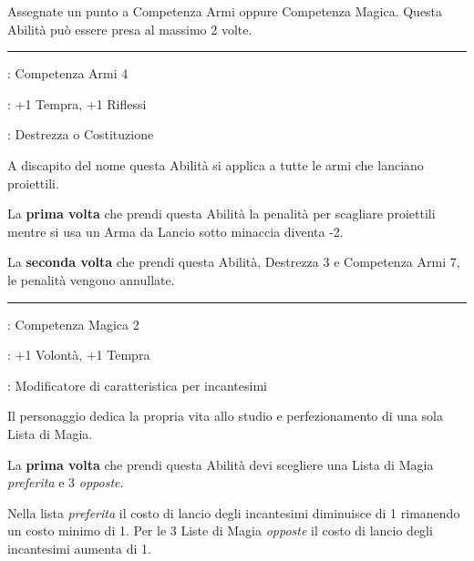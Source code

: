 \begin{multicols}{2}
Assegnate un punto a Competenza Armi oppure Competenza Magica. Questa Abilità può essere presa al massimo 2 volte.

\smallskip\noindent\rule{\linewidth}{2pt} \hypertarget{Uno con l'arco}{}\medskip{}\label{Uno con l'arco}
\noindent
\begin{description}[noitemsep, topsep=0pt, parsep=0pt, partopsep=0pt, leftmargin=0cm, labelwidth=2.5cm]
    \item[\textbf{Requisito}]: Competenza Armi 4
    \item[\textbf{Tiri Salvezza}]: +1 Tempra, +1 Riflessi
    \item[\textbf{Caratteristica}]: Destrezza o Costituzione
\end{description}

A discapito del nome questa Abilità si applica a tutte le armi che lanciano proiettili.

La \textbf{prima volta} che prendi questa Abilità la penalità per scagliare proiettili mentre si usa un Arma da Lancio sotto minaccia diventa -2.

La \textbf{seconda volta} che prendi questa Abilità, Destrezza 3 e Competenza Armi 7, le penalità vengono annullate.

\smallskip\noindent\rule{\linewidth}{2pt} \hypertarget{Un solo credo}{}\medskip{}\label{Un solo credo}
\noindent
\begin{description}[noitemsep, topsep=0pt, parsep=0pt, partopsep=0pt, leftmargin=0cm, labelwidth=2.5cm]
    \item[\textbf{Requisito}]: Competenza Magica 2
    \item[\textbf{Tiri Salvezza}]: +1 Volontà, +1 Tempra
    \item[\textbf{Caratteristica}]: Modificatore di caratteristica per incantesimi
\end{description}

Il personaggio dedica la propria vita allo studio e perfezionamento di una sola Lista di Magia.

La \textbf{prima volta} che prendi questa Abilità devi scegliere una Lista di Magia \emph{preferita} e 3 \emph{opposte}.

Nella lista \emph{preferita} il costo di lancio degli incantesimi diminuisce di 1 rimanendo un costo minimo di 1. Per le 3 Liste di Magia \emph{opposte} il costo di lancio degli incantesimi aumenta di 1.


\end{multicols}
